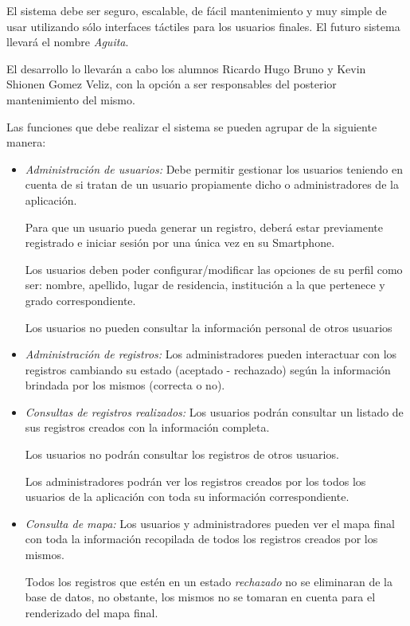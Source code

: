 El sistema debe ser seguro, escalable, de fácil mantenimiento y muy simple de usar utilizando sólo interfaces táctiles para los usuarios finales. El futuro sistema llevará el nombre \emph{Aguita}.

El desarrollo lo llevarán a cabo los alumnos Ricardo Hugo Bruno y Kevin Shionen Gomez Veliz, con la opción a ser responsables del posterior mantenimiento del mismo.


Las funciones que debe realizar el sistema se pueden agrupar de la siguiente manera:

  \begin{itemize}
  
  \item \emph{Administración de usuarios:} Debe permitir gestionar los usuarios teniendo en cuenta de si tratan de un usuario propiamente dicho o administradores de la aplicación.
    
    Para que un usuario pueda generar un registro, deberá estar previamente registrado e iniciar sesión por una única vez en su Smartphone.
    
    Los usuarios deben poder configurar/modificar las opciones de su perfil como ser: nombre, apellido, lugar de residencia, institución a la que pertenece y grado correspondiente.

    Los usuarios no pueden consultar la información personal de otros usuarios
  
  \item \emph{Administración de registros:} Los administradores pueden interactuar con los registros cambiando su estado (aceptado - rechazado) según la información brindada por los mismos (correcta o no).
  
  \item \emph{Consultas de registros realizados:} Los usuarios podrán consultar un listado de sus registros creados con la información completa.
  
  Los usuarios no podrán consultar los registros de otros usuarios.

  Los administradores podrán ver los registros creados por los todos los usuarios de la aplicación con toda su información correspondiente.

  \item \emph{Consulta de mapa:} Los usuarios y administradores pueden ver el mapa final con toda la información recopilada de todos los registros creados por los mismos.

  Todos los registros que estén en un estado \emph{rechazado} no se eliminaran de la base de datos, no obstante, los mismos no se tomaran en cuenta para el renderizado del mapa final. 
  
  \end{itemize}

